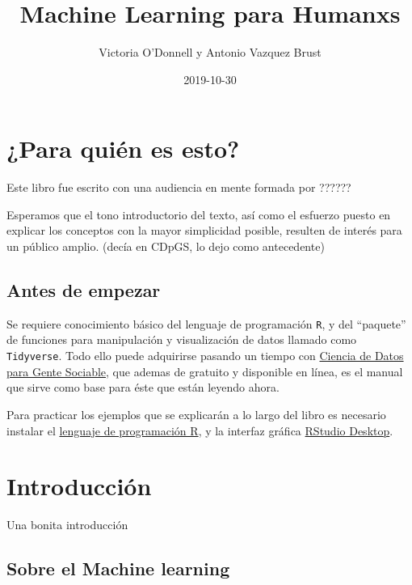 \documentclass[]{book}
\title{Machine Learning para Humanxs}
\author{Victoria O'Donnell y Antonio Vazquez Brust}
\date{2019-10-30}
\begin{document}
\maketitle

{
\setcounter{tocdepth}{1}
\tableofcontents
}
\hypertarget{para-quien-es-esto}{%
\chapter*{¿Para quién es esto?}\label{para-quien-es-esto}}

Este libro fue escrito con una audiencia en mente formada por ??????

Esperamos que el tono introductorio del texto, así como el esfuerzo puesto en explicar los conceptos con la mayor simplicidad posible, resulten de interés para un público amplio. (decía en CDpGS, lo dejo como antecedente)

\hypertarget{antes-de-empezar}{%
\section*{Antes de empezar}\label{antes-de-empezar}}

Se requiere conocimiento básico del lenguaje de programación \texttt{R}, y del ``paquete'' de funciones para manipulación y visualización de datos llamado como \texttt{Tidyverse}. Todo ello puede adquirirse pasando un tiempo con \href{https://bit.ly/datasoc}{Ciencia de Datos para Gente Sociable}, que ademas de gratuito y disponible en línea, es el manual que sirve como base para éste que están leyendo ahora.

Para practicar los ejemplos que se explicarán a lo largo del libro es necesario instalar el \href{https://cloud.r-project.org/}{lenguaje de programación R}, y la interfaz gráfica \href{https://www.rstudio.com/products/rstudio/download/}{RStudio Desktop}.

\hypertarget{intro}{%
\chapter{Introducción}\label{intro}}

Una bonita introducción

\hypertarget{sobre-el-machine-learning}{%
\section{Sobre el Machine learning}\label{sobre-el-machine-learning}}
\end{document}
